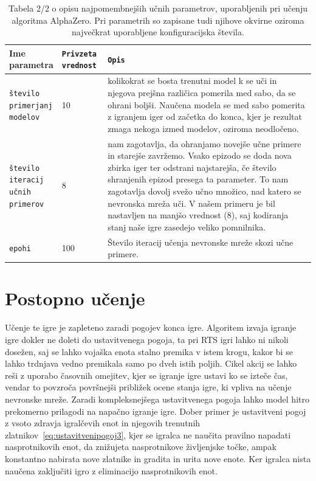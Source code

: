 \documentclass[a4paper, 12pt]{book}
\begin{document}
\begin{table}
	\begin{center}
		\begin{tabular}{p{0.15\linewidth}|p{0.15\linewidth}|p{0.7\linewidth}}
			Ime parametra                             & {\tt Privzeta vrednost} & {\tt Opis} \\ \hline

			{\tt število primerjanj modelov}  		  & 10 						& kolikokrat se bosta trenutni model k se uči in njegova prejšna različica pomerila med sabo, da se ohrani boljši.
																				  Naučena modela se med sabo pomerita z igranjem iger od začetka do konca, kjer je rezultat zmaga nekoga izmed modelov, oziroma neodločeno.\\
			{\tt število iteracij učnih primerov}     & 8 						& nam zagotavlja, da ohranjamo novejše učne primere in starejše zavržemo.
																				  Vsako epizodo se doda nova zbirka iger ter odstrani najstarejša, če število shranjenih epizod presega ta parameter.
																				  To nam zagotavlja dovolj svežo učno množico, nad katero se nevronska mreža uči.
																				  V našem primeru je bil nastavljen na manjšo vrednost (8), saj kodiranja stanj naše igre zasedejo veliko pomnilnika.\\
			{\tt epohi}     						  & 100 					& Število iteracij učenja nevronske mreže skozi učne primere.\\
		\end{tabular}
	\end{center}
	\caption{Tabela 2/2 o opisu najpomembnejših učnih parametrov, uporabljenih pri učenju algoritma AlphaZero. Pri parametrih so zapisane tudi njihove okvirne oziroma največkrat uporabljene konfiguracijska števila.}
	\label{tableParameters2}
\end{table}



\section{Postopno učenje}
Učenje te igre je zapleteno zaradi pogojev konca igre. 
Algoritem izvaja igranje igre dokler ne doleti do ustavitvenega pogoja, ta pri RTS igri lahko ni nikoli dosežen, saj se lahko vojaška enota stalno premika v istem krogu, kakor bi se lahko trdnjava vedno premikala samo po dveh istih poljih.
Cikel akcij se lahko reši z uporabo časovnih omejitev, kjer se igranje igre ustavi ko se izteče čas, vendar to povzroča površnejši približek ocene stanja igre, ki vpliva na učenje nevronske mreže.
Zaradi kompleksnejšega ustavitvenega pogoja lahko model hitro prekomerno prilagodi na napačno igranje igre.
Dober primer je ustavitveni pogoj z vsoto zdravja igralčevih enot in njegovih trenutnih zlatnikov~\ref{eq:ustavitvenipogoj3}, kjer se igralca ne naučita pravilno napadati nasprotnikovih enot, da znižujeta nasprotnikove življenjske točke, ampak konstantno nabirata nove zlatnike in gradita in urita nove enote.
Ker igralca nista naučena zaključiti igro z eliminacijo nasprotnikovih enot.
\end{document}

